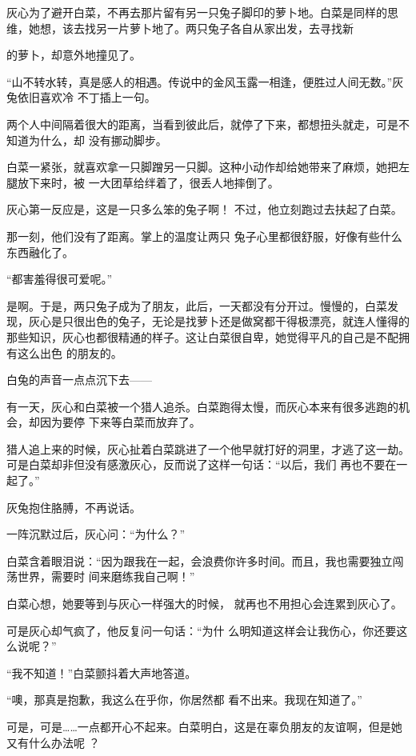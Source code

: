 \documentclass{article}
\begin{document}
灰心为了避开白菜，不再去那片留有另一只兔子脚印的萝卜地。白菜是同样的思维，她想，该去找另一片萝卜地了。两只兔子各自从家出发，去寻找新
\newpage

的萝卜，却意外地撞见了。 

“山不转水转，真是感人的相遇。传说中的金风玉露一相逢，便胜过人间无数。”灰兔依旧喜欢冷
不丁插上一句。 

两个人中间隔着很大的距离，当看到彼此后，就停了下来，都想扭头就走，可是不知道为什么，却
没有挪动脚步。 

白菜一紧张，就喜欢拿一只脚蹭另一只脚。这种小动作却给她带来了麻烦，她把左腿放下来时，被
一大团草给绊着了，很丢人地摔倒了。 

灰心第一反应是，这是一只多么笨的兔子啊！
不过，他立刻跑过去扶起了白菜。 

那一刻，他们没有了距离。掌上的温度让两只
兔子心里都很舒服，好像有些什么东西融化了。 


\newpage

“都害羞得很可爱呢。” 

是啊。于是，两只兔子成为了朋友，此后，一天都没有分开过。慢慢的，白菜发现，灰心是只很出色的兔子，无论是找萝卜还是做窝都干得极漂亮，就连人懂得的那些知识，灰心也都很精通的样子。这让白菜很自卑，她觉得平凡的自己是不配拥有这么出色
的朋友的。 


白兔的声音一点点沉下去—— 

有一天，灰心和白菜被一个猎人追杀。白菜跑得太慢，而灰心本来有很多逃跑的机会，却因为要停
下来等白菜而放弃了。 

猎人追上来的时候，灰心扯着白菜跳进了一个他早就打好的洞里，才逃了这一劫。可是白菜却非但没有感激灰心，反而说了这样一句话：“以后，我们
再也不要在一起了。” 


灰兔抱住胳膊，不再说话。 

\newpage


一阵沉默过后，灰心问：“为什么？” 

白菜含着眼泪说：“因为跟我在一起，会浪费你许多时间。而且，我也需要独立闯荡世界，需要时
间来磨练我自己啊！” 

白菜心想，她要等到与灰心一样强大的时候，
就再也不用担心会连累到灰心了。 

可是灰心却气疯了，他反复问一句话：“为什
么明知道这样会让我伤心，你还要这么说呢？” 


“我不知道！”白菜颤抖着大声地答道。 

“噢，那真是抱歉，我这么在乎你，你居然都
看不出来。我现在知道了。” 

可是，可是……一点都开心不起来。白菜明白，这是在辜负朋友的友谊啊，但是她又有什么办法呢
？ 
\end{document}
